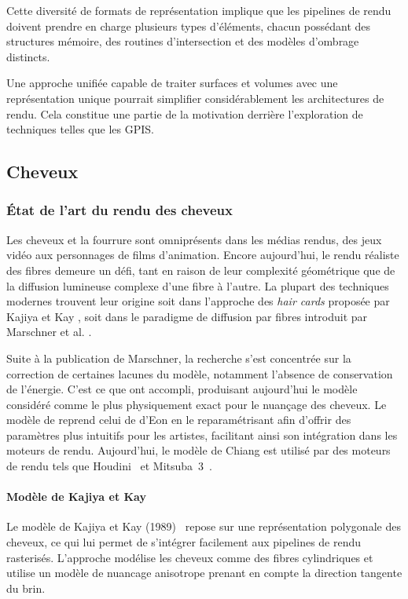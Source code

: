 Cette diversité de formats de représentation implique que les pipelines de rendu doivent prendre en charge plusieurs types d'éléments, chacun possédant des structures mémoire, des routines d'intersection et des modèles d'ombrage distincts.

Une approche unifiée capable de traiter surfaces et volumes avec une représentation unique pourrait simplifier considérablement les architectures de rendu. Cela constitue une partie de la motivation derrière l'exploration de techniques telles que les GPIS.

\subsection{Cheveux}

\subsubsection{État de l'art du rendu des cheveux}

Les cheveux et la fourrure sont omniprésents dans les médias rendus, des jeux vidéo aux personnages de films d'animation. Encore aujourd'hui, le rendu réaliste des fibres demeure un défi, tant en raison de leur complexité géométrique que de la diffusion lumineuse complexe d'une fibre à l'autre. La plupart des techniques modernes trouvent leur origine soit dans l'approche des \textit{hair cards} proposée par Kajiya et Kay \cite{kajiya1989rendering}, soit dans le paradigme de diffusion par fibres introduit par Marschner et al. \cite{marschner2003}.

Suite à la publication de Marschner, la recherche s'est concentrée sur la correction de certaines lacunes du modèle, notamment l'absence de conservation de l'énergie. C'est ce que \textcite{deon2011egsr} ont accompli, produisant aujourd'hui le modèle considéré comme le plus physiquement exact pour le nuançage des cheveux. Le modèle de \textcite{chiang2016} reprend celui de d'Eon en le reparamétrisant afin d'offrir des paramètres plus intuitifs pour les artistes, facilitant ainsi son intégration dans les moteurs de rendu. Aujourd'hui, le modèle de Chiang est utilisé par des moteurs de rendu tels que Houdini~\cite{Houdini} et Mitsuba~3~\cite{Mitsuba3}.

\paragraph{Modèle de Kajiya et Kay}

Le modèle de Kajiya et Kay (1989)~\cite{kajiya1989rendering} repose sur une représentation polygonale des cheveux, ce qui lui permet de s'intégrer facilement aux pipelines de rendu rasterisés. L'approche modélise les cheveux comme des fibres cylindriques et utilise un modèle de nuancage anisotrope prenant en compte la direction tangente du brin.

